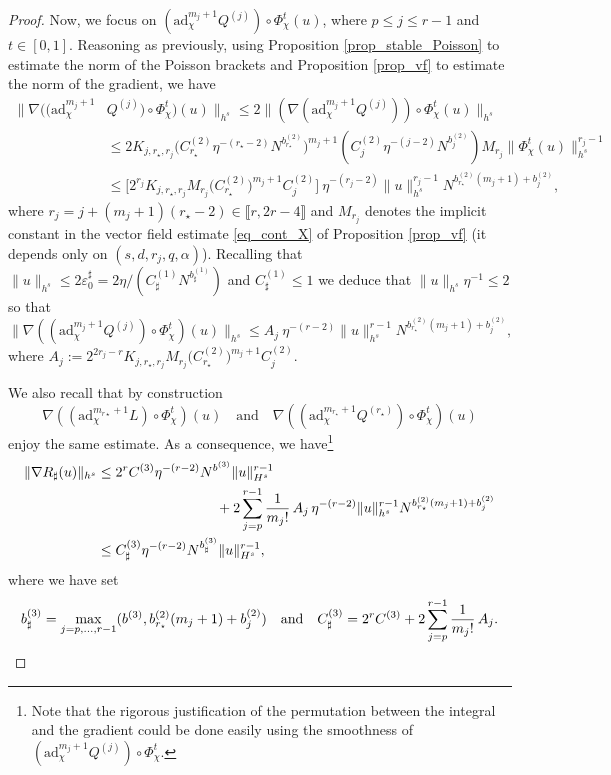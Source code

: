 \documentclass[JEP,XML,SOM,Unicode,NoEqCountersInSection,published]{cedram}
\theoremstyle{definition}
\begin{document}
\begin{proof}
Now, we focus on $(\mathrm{ad}_{\chi}^{m_j+1} Q^{(j)}) \circ \Phi_\chi^t(u) $, where $p\leq j \leq r-1$ and $t\in [0,1]$. Reasoning as previously, using Proposition \ref{prop_stable_Poisson} to estimate the norm of the Poisson brackets and Proposition \ref{prop_vf} to estimate the norm of the gradient, we have
\begin{equation*}
\begin{split}
\| \nabla ((\mathrm{ad}_{\chi}^{m_j+1} &Q^{(j)}) \circ \Phi_\chi^t)(u) \|_{h^s} \leq 2 \| (\nabla (\mathrm{ad}_{\chi}^{m_j+1} Q^{(j)}))\circ \Phi_\chi^t (u) \|_{h^s} \\
&\leq 2 K_{j,r_\star,r_j} \big(C_{r_\star}^{(2)} \eta^{-(r_\star-2)} N^{b_{r_\star}^{(2)}} \big)^{m_j+1} (C_{j}^{(2)} \eta^{-(j-2)} N^{b_{j}^{(2)}}) M_{r_j} \| \Phi_\chi^t (u) \|_{h^s}^{r_j-1} \\
&\leq \big[2^{r_j} K_{j,r_\star,r_j} M_{r_j} \big(C_{r_\star}^{(2)})^{m_j+1} C_{j}^{(2)} \big] \ \eta^{-(r_j -2)} \|u\|_{h^s}^{r_j-1} N^{b_{r_\star}^{(2)} (m_j+1) + b_{j}^{(2)} },
\end{split}
\end{equation*}
where $r_j = j+(m_j+1)(r_\star - 2) \in \llbracket r,2r-4\rrbracket$ and $M_{r_j}$ denotes the implicit constant in the vector field estimate \eqref{eq_cont_X} of Proposition \ref{prop_vf} (it depends only on $(s,d,r_j,q,\alpha)$).
Recall\-ing that $\| u \|_{h^s} \leq 2 \varepsilon_0^\sharp= 2 \eta/ (C^{(1)}_\sharp N^{b^{(1)}_\sharp})$ and $C^{(1)}_\sharp \leq 1 $ we deduce that $\| u \|_{h^s} \eta^{-1} \leq 2$ so that
\[
\| \nabla ((\mathrm{ad}_{\chi}^{m_j+1} Q^{(j)}) \circ \Phi_\chi^t)(u) \|_{h^s} \leq A_j \ \eta^{-(r -2)} \|u\|_{h^s}^{r-1} N^{b_{r_\star}^{(2)} (m_j+1) + b_{j}^{(2)} },
\]
where $A_j:= 2^{2r_j-r} K_{j,r_\star,r_j} M_{r_j} \big(C_{r_\star}^{(2)})^{m_j+1} C_{j}^{(2)}$.

We also recall that by construction
\[
\nabla ((\mathrm{ad}_{\chi}^{m_{r\star}+1} L) \circ \Phi_\chi^t)(u) \quad\text{and} \quad\nabla ((\mathrm{ad}_{\chi}^{m_{r_\star}+1} Q^{(r_\star)}) \circ \Phi_\chi^t)(u)
\]
enjoy the same estimate. As a consequence, we have\footnote{Note that the rigorous justification of the permutation between the integral and the gradient could be done easily using the smoothness of $(\mathrm{ad}_{\chi}^{m_j+1} Q^{(j)}) \circ \Phi_\chi^t$.}
\begin{equation*}
\begin{split}
\| \nabla R_\sharp(u) \|_{h^s} &\leq 2^r C^{(3)} \eta^{-(r-2)} N^{b^{(3)}} \| u \|_{H^s}^{r-1} \\
&\hspace*{3cm}+ 2\sum_{j=p}^{r-1} \frac1{m_j !}\, A_j \, \eta^{-(r -2)} \|u\|_{h^s}^{r-1} N^{b_{r_\star}^{(2)} (m_j+1) + b_{j}^{(2)} } \\
&\leq C^{(3)}_\sharp \eta^{-(r-2)} N^{b^{(3)}_\sharp} \|u\|_{H^s}^{r-1},
\end{split}
\end{equation*}
where we have set
\[
b^{(3)}_\sharp = \max_{j = p,\dots,r-1} (b^{(3)}, b_{r_\star}^{(2)} (m_j+1) + b_{j}^{(2)}) \quad \text{and} \quad C^{(3)}_\sharp = 2^r C^{(3)} + 2\sum_{j=p}^{r-1} \frac1{m_j !}\, A_j.\qedhere
\]
\end{proof}
\end{document}
